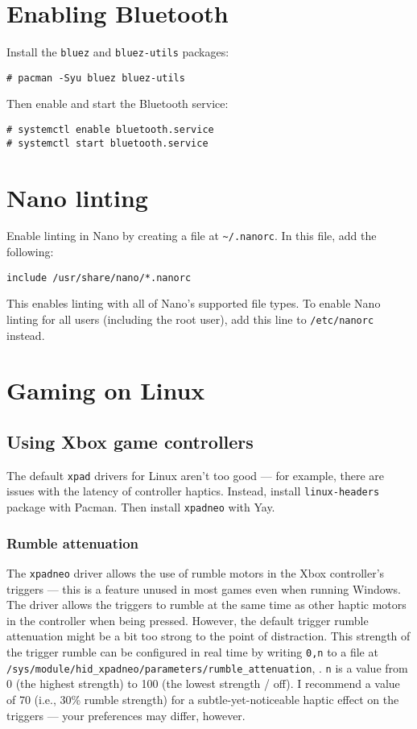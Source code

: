 \documentclass[a4paper]{article}
\begin{document}
\section{Enabling Bluetooth}

Install the \lstinline|bluez| and \lstinline|bluez-utils| packages:
\begin{lstlisting}
# pacman -Syu bluez bluez-utils
\end{lstlisting}

Then enable and start the Bluetooth service:
\begin{lstlisting}
# systemctl enable bluetooth.service
# systemctl start bluetooth.service
\end{lstlisting}


\section{Nano linting}

Enable linting in Nano by creating a file at \lstinline|~/.nanorc|.
In this file, add the following:
\begin{lstlisting}
include /usr/share/nano/*.nanorc
\end{lstlisting}
This enables linting with all of Nano's supported file types.
To enable Nano linting for all users (including the root user), add this line to \lstinline|/etc/nanorc| instead.


\section{Gaming on Linux}

\subsection{Using Xbox game controllers}

The default \lstinline|xpad| drivers for Linux aren't too good --- for example, there are issues with the latency of controller haptics.
Instead, install \lstinline|linux-headers| package with Pacman.
Then install \lstinline|xpadneo| with Yay.

\subsubsection{Rumble attenuation}

The \lstinline|xpadneo| driver allows the use of rumble motors in the Xbox controller's triggers --- this is a feature unused in most games even when running Windows.
The driver allows the triggers to rumble at the same time as other haptic motors in the controller when being pressed.
However, the default trigger rumble attenuation might be a bit too strong to the point of distraction.
This strength of the trigger rumble can be configured in real time by writing \lstinline|0,n| to a file at \lstinline|/sys/module/hid_xpadneo/parameters/rumble_attenuation|, \cite{xpadneo-troubleshooting}.
\lstinline|n| is a value from 0 (the highest strength) to 100 (the lowest strength / off).
I recommend a value of 70 (i.e., 30\% rumble strength) for a subtle-yet-noticeable haptic effect on the triggers --- your preferences may differ, however.
\end{document}
